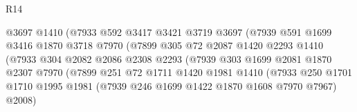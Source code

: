 \begin{lexlean}{R14}
\begin{coremodule}
                                      @3697
                                      @1410
                                      (@7933
                                        @592
                                        @3417
                                        @3421
                                        @3719
                                        @3697
                                        (@7939
                                          @591
                                          @1699
                                          @3416
                                          @1870
                                          @3718
                                          @7970
                                          (@7899
                                            @305
                                            @72
                                            @2087
                                            @1420
                                            @2293
                                            @1410
                                            (@7933
                                              @304
                                              @2082
                                              @2086
                                              @2308
                                              @2293
                                              (@7939
                                                @303
                                                @1699
                                                @2081
                                                @1870
                                                @2307
                                                @7970
                                                (@7899
                                                  @251
                                                  @72
                                                  @1711
                                                  @1420
                                                  @1981
                                                  @1410
                                                  (@7933
                                                    @250
                                                    @1701
                                                    @1710
                                                    @1995
                                                    @1981
                                                    (@7939 @246 @1699 @1422 @1870 @1608 @7970 @7967)
                                                    @2008)

\end{coremodule}
\end{lexlean}
